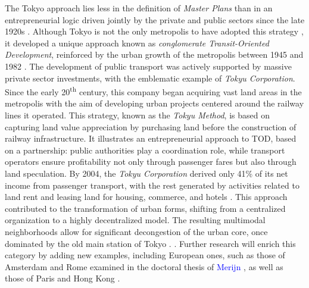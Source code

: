 \begin{refsegment}
{    The Tokyo approach lies less in the definition of \textsl{Master Plans} than in an entrepreneurial logic driven jointly by the private and public sectors since the late 1920s \textcolor{blue}{\autocite[p.~181-209 (chapter 7)]{cervero_transit_1998}}. Although Tokyo is not the only metropolis to have adopted this strategy \textcolor{blue}{\autocite[87]{bertolini_developing_2016}}, it developed a unique approach known as \textsl{conglomerate Transit-Oriented Development}, reinforced by the urban growth of the metropolis between 1945 and 1982 \textcolor{blue}{\autocite[28-29]{liu_historical_2024}}. The development of public transport was actively supported by massive private sector investments, with the emblematic example of \textsl{Tokyu Corporation}. Since the early 20\textsuperscript{th} century, this company began acquiring vast land areas in the metropolis with the aim of developing urban projects centered around the railway lines it operated. This strategy, known as the \textsl{Tokyu Method}, is based on capturing land value appreciation by purchasing land before the construction of railway infrastructure. It illustrates an entrepreneurial approach to \acrshort{TOD}, based on a  partnership: public authorities play a coordination role, while transport operators ensure profitability not only through passenger fares but also through land speculation. By 2004, the \textsl{Tokyu Corporation} derived only 41\% of its net income from passenger transport, with the rest generated by activities related to land rent and leasing land for housing, commerce, and hotels \textcolor{blue}{\autocite[110]{suzuki_financing_2015}}. This approach contributed to the transformation of urban forms, shifting from a centralized organization to a highly decentralized model. The resulting multimodal neighborhoods allow for significant decongestion of the urban core, once dominated by the old main station of Tokyo \textcolor{blue}{\autocite[29]{liu_historical_2024}}.
} \textcolor{blue}{\autocite[109-209]{cervero_transit_1998}}. Further research will enrich this category by adding new examples, including European ones, such as those of Amsterdam and Rome examined in the doctoral thesis of \textcolor{blue}{Merijn} \textcolor{blue}{\textcite[180-206]{martens_adaptive_2006}}, as well as those of Paris and Hong Kong \textcolor{blue}{\autocite[4]{knowles_transports_2020}}.%


\end{refsegment}
